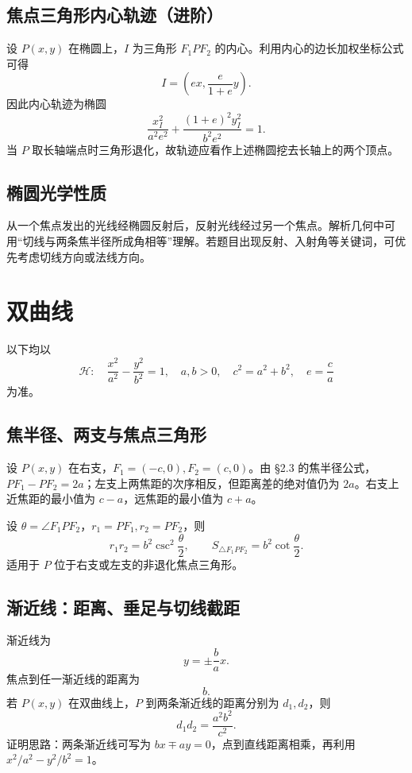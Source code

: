 \documentclass[UTF8,zihao=-4,a4paper]{ctexart}
\begin{document}
\subsection{焦点三角形内心轨迹（进阶）}

设 $P(x,y)$ 在椭圆上，$I$ 为三角形 $F_1PF_2$ 的内心。利用内心的边长加权坐标公式可得
\[
\boxed{I=\left(ex,\frac{e}{1+e}y\right)}.
\]
因此内心轨迹为椭圆
\[
\boxed{
\frac{x_I^2}{a^2e^2}
+\frac{(1+e)^2y_I^2}{b^2e^2}=1.}
\]
当 $P$ 取长轴端点时三角形退化，故轨迹应看作上述椭圆挖去长轴上的两个顶点。

\subsection{椭圆光学性质}

从一个焦点发出的光线经椭圆反射后，反射光线经过另一个焦点。解析几何中可用“切线与两条焦半径所成角相等”理解。若题目出现反射、入射角等关键词，可优先考虑切线方向或法线方向。

\section{双曲线}

以下均以
\[
\mathcal H:\quad \frac{x^2}{a^2}-\frac{y^2}{b^2}=1,\quad a,b>0,\quad c^2=a^2+b^2,\quad e=\frac ca
\]
为准。

\subsection{焦半径、两支与焦点三角形}

设 $P(x,y)$ 在右支，$F_1=(-c,0),F_2=(c,0)$。由 §2.3 的焦半径公式，$PF_1-PF_2=2a$；左支上两焦距的次序相反，但距离差的绝对值仍为 $2a$。右支上近焦距的最小值为 $c-a$，远焦距的最小值为 $c+a$。

设 $\theta=\angle F_1PF_2$，$r_1=PF_1,r_2=PF_2$，则
\[
\boxed{r_1r_2=b^2\csc^2\frac{\theta}{2}},
\qquad
\boxed{S_{\triangle F_1PF_2}=b^2\cot\frac{\theta}{2}}.
\]
适用于 $P$ 位于右支或左支的非退化焦点三角形。

\subsection{渐近线：距离、垂足与切线截距}

渐近线为
\[
y=\pm\frac ba x.
\]
焦点到任一渐近线的距离为
\[
\boxed{b}.
\]
若 $P(x,y)$ 在双曲线上，$P$ 到两条渐近线的距离分别为 $d_1,d_2$，则
\[
\boxed{d_1d_2=\frac{a^2b^2}{c^2}}.
\]
证明思路：两条渐近线可写为 $bx\mp ay=0$，点到直线距离相乘，再利用 $x^2/a^2-y^2/b^2=1$。
\end{document}
